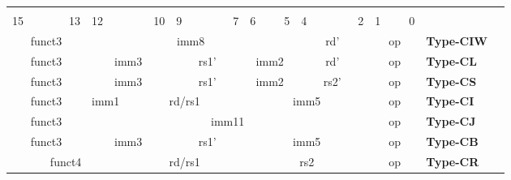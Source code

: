 \documentclass{report}
\begin{document}
\begin{table}[p]
\begin{small}
\begin{center}
\begin{tabular}{p{0.05mm}p{0.05mm}p{0.05mm}p{0.05mm}p{0.05mm}p{0.05mm}p{0.05mm}p{0.05mm}p{0.05mm}p{0.05mm}p{0.05mm}p{0.05mm}p{0.05mm}p{0.05mm}p{0.05mm}p{0.05mm}p{0.05mm}p{0.05mm}p{0.05mm}p{0.05mm}p{0.05mm}p{0.05mm}p{0.05mm}p{0.05mm}p{0.05mm}p{0.05mm}p{0.05mm}p{0.05mm}p{0.05mm}p{0.05mm}p{0.05mm}p{0.05mm}p{50mm}l}& & & & & & & & & & & & & & & & & & & & & & & & & & & & & & & & & \\
\multicolumn{1}{l}{\scriptsize{15}} & \multicolumn{5}{r}{\scriptsize{13}} & \multicolumn{1}{l}{\scriptsize{12}} & \multicolumn{5}{r}{\scriptsize{10}} & \multicolumn{1}{l}{\scriptsize{9}} & \multicolumn{5}{r}{\scriptsize{7}} & \multicolumn{1}{l}{\scriptsize{6}} & \multicolumn{3}{r}{\scriptsize{5}} & \multicolumn{1}{l}{\scriptsize{4}} & \multicolumn{5}{r}{\scriptsize{2}} & \multicolumn{1}{l}{\scriptsize{1}} & \multicolumn{3}{r}{\scriptsize{0}} &  \\
\cline{1-32}
\multicolumn{6}{|c|}{funct3} & \multicolumn{16}{c|}{imm8} & \multicolumn{6}{c|}{rd'} & \multicolumn{4}{c|}{op} & \scriptsize{\bf Type-CIW} \\
\cline{1-32}
\multicolumn{6}{|c|}{funct3} & \multicolumn{6}{c|}{imm3} & \multicolumn{6}{c|}{rs1'} & \multicolumn{4}{c|}{imm2} & \multicolumn{6}{c|}{rd'} & \multicolumn{4}{c|}{op} & \scriptsize{\bf Type-CL} \\
\cline{1-32}
\multicolumn{6}{|c|}{funct3} & \multicolumn{6}{c|}{imm3} & \multicolumn{6}{c|}{rs1'} & \multicolumn{4}{c|}{imm2} & \multicolumn{6}{c|}{rs2'} & \multicolumn{4}{c|}{op} & \scriptsize{\bf Type-CS} \\
\cline{1-32}
\multicolumn{6}{|c|}{funct3} & \multicolumn{2}{c|}{imm1} & \multicolumn{10}{c|}{rd/rs1} & \multicolumn{10}{c|}{imm5} & \multicolumn{4}{c|}{op} & \scriptsize{\bf Type-CI} \\
\cline{1-32}
\multicolumn{6}{|c|}{funct3} & \multicolumn{22}{c|}{imm11} & \multicolumn{4}{c|}{op} & \scriptsize{\bf Type-CJ} \\
\cline{1-32}
\multicolumn{6}{|c|}{funct3} & \multicolumn{6}{c|}{imm3} & \multicolumn{6}{c|}{rs1'} & \multicolumn{10}{c|}{imm5} & \multicolumn{4}{c|}{op} & \scriptsize{\bf Type-CB} \\
\cline{1-32}
\multicolumn{8}{|c|}{funct4} & \multicolumn{10}{c|}{rd/rs1} & \multicolumn{10}{c|}{rs2} & \multicolumn{4}{c|}{op} & \scriptsize{\bf Type-CR} \\

\end{tabular}
\end{center}
\end{small}
\end{table}
\end{document}
